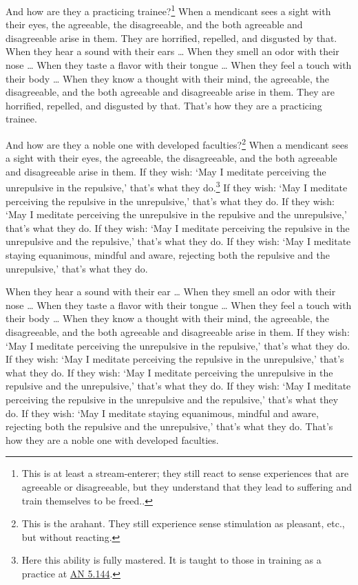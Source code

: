 \documentclass[12pt,openany]{book}%
\begin{document}
And how are they a practicing trainee?\footnote{This is at least a stream-enterer; they still react to sense experiences that are agreeable or disagreeable, but they understand that they lead to suffering and train themselves to be freed.. } When a mendicant sees a sight with their eyes, the agreeable, the disagreeable, and the both agreeable and disagreeable arise in them. They are horrified, repelled, and disgusted by that. When they hear a sound with their ears … When they smell an odor with their nose … When they taste a flavor with their tongue … When they feel a touch with their body … When they know a thought with their mind, the agreeable, the disagreeable, and the both agreeable and disagreeable arise in them. They are horrified, repelled, and disgusted by that. That’s how they are a practicing trainee. 

And how are they a noble one with developed faculties?\footnote{This is the arahant. They still experience sense stimulation as pleasant, etc., but without reacting. } When a mendicant sees a sight with their eyes, the agreeable, the disagreeable, and the both agreeable and disagreeable arise in them. If they wish: ‘May I meditate perceiving the unrepulsive in the repulsive,’ that’s what they do.\footnote{Here this ability is fully mastered. It is taught to those in training as a practice at \href{https://suttacentral.net/an5.144/en/sujato}{AN 5.144}. } If they wish: ‘May I meditate perceiving the repulsive in the unrepulsive,’ that’s what they do. If they wish: ‘May I meditate perceiving the unrepulsive in the repulsive and the unrepulsive,’ that’s what they do. If they wish: ‘May I meditate perceiving the repulsive in the unrepulsive and the repulsive,’ that’s what they do. If they wish: ‘May I meditate staying equanimous, mindful and aware, rejecting both the repulsive and the unrepulsive,’ that’s what they do. 

When they hear a sound with their ear … When they smell an odor with their nose … When they taste a flavor with their tongue … When they feel a touch with their body … When they know a thought with their mind, the agreeable, the disagreeable, and the both agreeable and disagreeable arise in them. If they wish: ‘May I meditate perceiving the unrepulsive in the repulsive,’ that’s what they do. If they wish: ‘May I meditate perceiving the repulsive in the unrepulsive,’ that’s what they do. If they wish: ‘May I meditate perceiving the unrepulsive in the repulsive and the unrepulsive,’ that’s what they do. If they wish: ‘May I meditate perceiving the repulsive in the unrepulsive and the repulsive,’ that’s what they do. If they wish: ‘May I meditate staying equanimous, mindful and aware, rejecting both the repulsive and the unrepulsive,’ that’s what they do. That’s how they are a noble one with developed faculties. 
\end{document}
